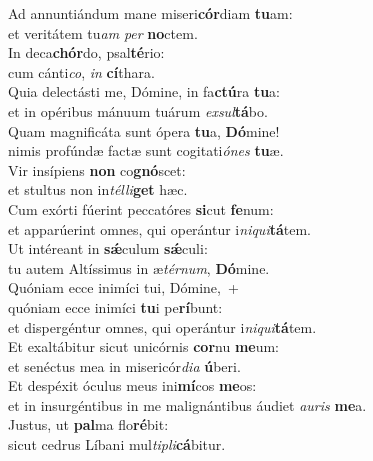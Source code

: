 \evenverse Ad annuntiándum mane miseri\textbf{cór}diam \textbf{tu}am:~\*\\
\evenverse et veritátem tu\textit{am} \textit{per} \textbf{no}ctem.\\
\oddverse In deca\textbf{chór}do, psal\textbf{té}rio:~\*\\
\oddverse cum cánti\textit{co}, \textit{in} \textbf{cí}thara.\\
\evenverse Quia delectásti me, Dómine, in fa\textbf{ctú}ra \textbf{tu}a:~\*\\
\evenverse et in opéribus mánuum tuárum \textit{ex}\textit{sul}\textbf{tá}bo.\\
\oddverse Quam magnificáta sunt ópera \textbf{tu}a, \textbf{Dó}mine!~\*\\
\oddverse nimis profúndæ factæ sunt cogitati\textit{ó}\textit{nes} \textbf{tu}æ.\\
\evenverse Vir insípiens \textbf{non} co\textbf{gnó}scet:~\*\\
\evenverse et stultus non in\textit{tél}\textit{li}\textbf{get} hæc.\\
\oddverse Cum exórti fúerint peccatóres \textbf{si}cut \textbf{fe}num:~\*\\
\oddverse et apparúerint omnes, qui operántur i\textit{ni}\textit{qui}\textbf{tá}tem.\\
\evenverse Ut intéreant in \textbf{sǽ}culum \textbf{sǽ}culi:~\*\\
\evenverse tu autem Altíssimus in æ\textit{tér}\textit{num}, \textbf{Dó}mine.\\
\oddverse Quóniam ecce inimíci tui, Dómine,~+\\
\oddverse  quóniam ecce inimíci \textbf{tu}i pe\textbf{rí}bunt:~\*\\
\oddverse et dispergéntur omnes, qui operántur i\textit{ni}\textit{qui}\textbf{tá}tem.\\
\evenverse Et exaltábitur sicut unicórnis \textbf{cor}nu \textbf{me}um:~\*\\
\evenverse et senéctus mea in misericór\textit{di}\textit{a} \textbf{ú}beri.\\
\oddverse Et despéxit óculus meus ini\textbf{mí}cos \textbf{me}os:~\*\\
\oddverse et in insurgéntibus in me malignántibus áudiet \textit{au}\textit{ris} \textbf{me}a.\\
\evenverse Justus, ut \textbf{pal}ma flo\textbf{ré}bit:~\*\\
\evenverse sicut cedrus Líbani mul\textit{ti}\textit{pli}\textbf{cá}bitur.\\
